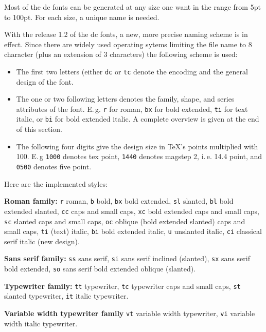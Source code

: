 \documentclass{article}
\renewcommand{\-}{\discretionary{\char'0177 }{}{}}
\begin{document}
Most of the \textsf{dc} fonts can be generated at any size one want in the 
range from 5pt to 100pt. For each size, a unique name is needed.

With the release 1.2 of the  \textsf{dc} fonts, a new, more precise naming 
scheme is in effect. Since there are widely used operating sytems limiting 
the file name to 8 character (plus an extension of 3 characters) the 
following scheme is used:

\begin{itemize}
\item The first two letters (either \texttt{dc} or \texttt{tc} denote
      the encoding and the general design of the font.
\item The one or two following letters denotes the family, shape, and 
      series attributes of the font. E.\,g. \texttt{r} for roman, 
      \texttt{bx} for bold extended, \texttt{ti} for text italic, or
      \texttt{bi} for bold extended italic. A complete overview is given 
      at the end of this section.
\item The following four digits give the design size in \TeX's points
      multiplied with 100. E.\,g \texttt{1000} denotes tex point,
      \texttt{1440} denotes magstep 2, i.\,e. 14.4 point, and
      \texttt{0500} denotes five point.
\end{itemize}

Here are the implemented styles:

\textbf{Roman family:} \texttt{r} roman, \texttt{b} bold, \texttt{bx} bold 
extended, \texttt{sl} slanted, \texttt{bl} bold extended slanted,
\texttt{cc} caps and small caps, \texttt{xc} bold extended caps and small 
caps, \texttt{sc} slanted caps and small caps, \texttt{oc} oblique
(bold extended slanted) caps and small caps,
\texttt{ti} (text) italic, \texttt{bi} bold extended italic, 
\texttt{u} unslanted 
italic, \texttt{ci} classical serif italic (new design).

\textbf{Sans serif family:} \texttt{ss} sans serif, \texttt{si} sans serif 
inclined (slanted), \texttt{sx} sans serif bold extended, 
\texttt{so} sans serif bold extended oblique (slanted).

\textbf{Typewriter family:} \texttt{tt} typewriter, \texttt{tc} typewriter 
caps and small caps, \texttt{st} slanted typewriter,
\texttt{it} italic typewriter.

\textbf{Variable width typewriter family}
\texttt{vt} variable width typewriter,
\texttt{vi} variable width italic typewriter.
\end{document}

